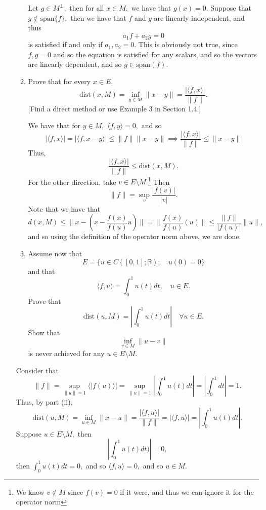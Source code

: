 \documentclass[11pt]{article}
\begin{document}
\begin{problem}
\begin{enumerate}
\begin{problem}
\begin{enumerate}
\begin{solution}
        Let $g\in M^\perp,$ then for all $x\in M,$ we have that $g(x) = 0.$ Suppose that $g\notin \text{span}\{f\},$ then we have that $f$ and $g$ are linearly independent, and thus 
        \[a_1 f  + a_2 g = 0\] is satisfied if and only if $a_1, a_2 = 0.$ This is obviously not true, since $f, g = 0$ and so the equation is satisfied for any scalars, and so the vectors are linearly dependent, and so $g\in \text{span}(f).$
    \end{solution}
    \item Prove that for every $x \in E$, 
    \[
    \text{dist}(x, M) = \inf_{y \in M} \|x - y\| = \frac{|\langle f, x \rangle|}{\|f\|}.
    \]
    [Find a direct method or use Example 3 in Section 1.4.]
    \begin{solution}
        We have that for $y\in M,$ $\langle f, y \rangle = 0,$ and so 
        \[|\langle f, x\rangle| = |\langle f, x-y \rangle| \leq \|f\|\|x-y\| \implies \frac{|\langle f,x\rangle|}{\|f\|} \leq \|x-y\|\]
        Thus, 
        \[\frac{|\langle f,x\rangle|}{\|f\|} \leq \text{dist}(x,M).\] 
        For the other direction, take $v \in E\setminus M.$\footnote{We know $v \notin M$ since $f(v) = 0$ if it were, and thus we can ignore it for the operator norm}  Then 
        \[\|f\| = \sup_{v}\frac{|f(v)|}{|v|}.\] Note that we have that 
        \[d(x,M)\leq \|x - (x - \frac{f(x)}{f(u)}u)\| = \|\frac{f(x)}{f(u)}(u)\|\leq \frac{\|f\|}{|f(u)|}\|u\|,\] and so using the definition of the operator norm above, we are done.
    \end{solution}
    \item Assume now that 
    \[
    E = \{ u \in C([0,1]; \mathbb{R}) ; \quad u(0) = 0 \}
    \]
    and that
    \[
    \langle f, u \rangle = \int_0^1 u(t) dt, \quad u \in E.
    \]
    Prove that
    \[
    \text{dist}(u, M) = \left| \int_0^1 u(t) dt \right| \quad \forall u \in E.
    \]
    Show that 
    \[
    \inf_{v \in M} \|u - v\|
    \]
    is never achieved for any $u \in E \setminus M$.
\end{enumerate}
\end{problem}
\begin{solution}
    Consider that 
    \[\|f\| = \sup_{\|u\| = 1} \langle |f(u)\rangle| = \sup_{\|u\| = 1}|\int_0^1 u(t)dt| = |\int_0^1 dt| = 1.\] Thus, by part (ii), 
    \[\text{dist}(u,M) = \inf_{u\in M}\|x-u\| = \frac{|\langle f, u\rangle|}{\|f\|} = |\langle f, u\rangle| = \left| \int_0^1 u(t)dt\right|.\] Suppose $u\in E\setminus M,$ then 
    \[|\int_0^1u(t)dt)| = 0,\] then $\int_0^1 u(t)dt = 0,$ and so $\langle f, u \rangle = 0,$ and so $u \in M.$
\end{solution}


\end{enumerate}
\end{problem}
\end{document}
